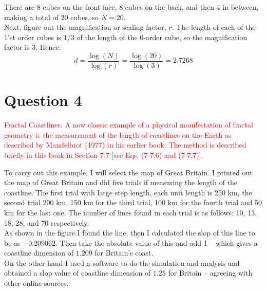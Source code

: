 \documentclass[12pt]{article}
\begin{document}
\vspace{0.2 in}

There are 8 cubes on the front face, $8$ cubes on the back, and then $4$ in between, making a total of $20$ cubes, so $N = 20$.\\

Next, figure out the magnification or scaling factor, $r$. The length of each of the 1'st order cubes is $1/3$ of the length of the 0-order cube, so the magnification factor is $3$. Hence:
$$d=\frac{\log (N)}{\log (r)}=\frac{\log (20)}{\log (3)}=2.7268$$




\newpage

\section{Question 4}
\textcolor{red}{Fractal Coastlines. A now classic example of a physical manifestation of fractal geometry is the measurement of the length of coastlines on the Earth as described by Mandelbrot (1977) in his earlier book. The method is described briefly in this book in Section 7.7 [see Eqs. (7-7.6) and (7-7.7)].}\\

\vspace{0.2 in}

To carry out this example, I will select the map of Great Britain. I printed out the map of Great Britain and did five trials if measuring the length of the coastline. The first trial with large step length, each unit length is 250 km, the second trial 200 km, 150 km for the third trial, 100 km for the fourth trial and 50 km for the last one. The number of lines found in each trial is as follows: 10, 13, 18, 28, and 70 respectively. \\

As shown in the figure I found the line, then I calculated the slop of this line to be as $-0.209062$. Then take the absolute value of this and add 1 – which gives a coastline dimension of $1.209$ for Britain's coast. \\



On the other hand I used a software to do the simulation and analysis and obtained a slop value of coastline dimension of $1.25$ for Britain – agreeing with other online sources.\\
\end{document}
